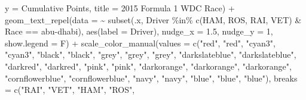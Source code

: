 \documentclass[
]{book}
\newenvironment{Shaded}{\begin{snugshade}}{\end{snugshade}}
\newcommand{\AttributeTok}[1]{\textcolor[rgb]{0.77,0.63,0.00}{#1}}
\newcommand{\DecValTok}[1]{\textcolor[rgb]{0.00,0.00,0.81}{#1}}
\newcommand{\FloatTok}[1]{\textcolor[rgb]{0.00,0.00,0.81}{#1}}
\newcommand{\FunctionTok}[1]{\textcolor[rgb]{0.00,0.00,0.00}{#1}}
\newcommand{\NormalTok}[1]{#1}
\newcommand{\SpecialCharTok}[1]{\textcolor[rgb]{0.00,0.00,0.00}{#1}}
\newcommand{\StringTok}[1]{\textcolor[rgb]{0.31,0.60,0.02}{#1}}
\begin{document}
\begin{Shaded}
\begin{Highlighting}[]
       \AttributeTok{y =} \StringTok{\textquotesingle{}Cumulative Points\textquotesingle{}}\NormalTok{,}
       \AttributeTok{title =} \StringTok{\textquotesingle{}2015 Formula 1 WDC Race\textquotesingle{}}\NormalTok{) }\SpecialCharTok{+} \FunctionTok{geom\_text\_repel}\NormalTok{(}\AttributeTok{data =} \SpecialCharTok{\textasciitilde{}} \FunctionTok{subset}\NormalTok{(.x, Driver }\SpecialCharTok{\%in\%} \FunctionTok{c}\NormalTok{(}\StringTok{\textquotesingle{}HAM\textquotesingle{}}\NormalTok{, }\StringTok{\textquotesingle{}ROS\textquotesingle{}}\NormalTok{, }\StringTok{\textquotesingle{}RAI\textquotesingle{}}\NormalTok{, }\StringTok{\textquotesingle{}VET\textquotesingle{}}\NormalTok{) }\SpecialCharTok{\&}\NormalTok{ Race }\SpecialCharTok{==} \StringTok{\textquotesingle{}abu{-}dhabi\textquotesingle{}}\NormalTok{),}
            \FunctionTok{aes}\NormalTok{(}\AttributeTok{label =}\NormalTok{ Driver),}
            \AttributeTok{nudge\_x =} \FloatTok{1.5}\NormalTok{, }\AttributeTok{nudge\_y =} \DecValTok{1}\NormalTok{, }\AttributeTok{show.legend =}\NormalTok{ F) }\SpecialCharTok{+} 
  \FunctionTok{scale\_color\_manual}\NormalTok{(}\AttributeTok{values =} \FunctionTok{c}\NormalTok{(}\StringTok{"red"}\NormalTok{, }\StringTok{"red"}\NormalTok{, }
                                \StringTok{"cyan3"}\NormalTok{, }\StringTok{"cyan3"}\NormalTok{, }
                                \StringTok{"black"}\NormalTok{, }\StringTok{"black"}\NormalTok{, }
                                \StringTok{"grey"}\NormalTok{, }\StringTok{"grey"}\NormalTok{, }\StringTok{"grey"}\NormalTok{,}
                                \StringTok{"darkslateblue"}\NormalTok{, }\StringTok{"darkslateblue"}\NormalTok{,}
                                \StringTok{"darkred"}\NormalTok{, }\StringTok{"darkred"}\NormalTok{, }
                                \StringTok{"pink"}\NormalTok{, }\StringTok{"pink"}\NormalTok{, }
                                \StringTok{"darkorange"}\NormalTok{, }\StringTok{"darkorange"}\NormalTok{, }\StringTok{"darkorange"}\NormalTok{,}
                                \StringTok{"cornflowerblue"}\NormalTok{, }\StringTok{"cornflowerblue"}\NormalTok{, }
                                \StringTok{"navy"}\NormalTok{, }\StringTok{"navy"}\NormalTok{,}
                                \StringTok{"blue"}\NormalTok{, }\StringTok{"blue"}\NormalTok{, }\StringTok{"blue"}\NormalTok{),}
                     \AttributeTok{breaks =} \FunctionTok{c}\NormalTok{(}\StringTok{"RAI"}\NormalTok{, }\StringTok{"VET"}\NormalTok{,}
                                \StringTok{"HAM"}\NormalTok{, }\StringTok{"ROS"}\NormalTok{,}

\end{Highlighting}
\end{Shaded}
\end{document}
